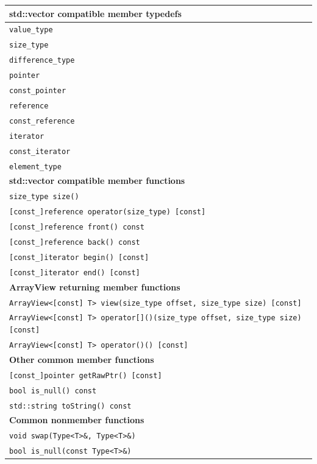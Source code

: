 \documentclass[pdf,ps2pdf,11pt]{SANDreport}
\begin{document}
\begin{table}
{\small\begin{center}
\begin{tabular}{|l|}
\hline
{}\textbf{std::vector compatible member typedefs} \\
\hline
{}\texttt{value\_type} \\
{}\texttt{size\_type} \\
{}\texttt{difference\_type} \\
{}\texttt{pointer} \\
{}\texttt{const\_pointer} \\
{}\texttt{reference} \\
{}\texttt{const\_reference} \\
{}\texttt{iterator} \\
{}\texttt{const\_iterator} \\
{}\texttt{element\_type} \\
\hline
{}\textbf{std::vector compatible member functions} \\
\hline
{}\texttt{size\_type size()} \\
{}\texttt{[const\_]reference operator{}(size\_type) [const]} \\
{}\texttt{[const\_]reference front() const} \\
{}\texttt{[const\_]reference back() const} \\
{}\texttt{[const\_]iterator begin() [const]} \\
{}\texttt{[const\_]iterator end() [const]} \\
\hline
{}\textbf{ArrayView returning member functions} \\
\hline
{}\texttt{ArrayView<[const] T> view(size\_type offset, size\_type size) [const]} \\
{}\texttt{ArrayView<[const] T> operator[]()(size\_type offset, size\_type size) [const]} \\
{}\texttt{ArrayView<[const] T> operator()() [const]} \\
\hline
{}\textbf{Other common member functions} \\
\hline
{}\texttt{[const\_]pointer getRawPtr() [const]} \\
{}\texttt{bool is\_null() const} \\
{}\texttt{std::string toString() const} \\
\hline
{}\textbf{Common nonmember functions} \\
\hline
{}\texttt{void swap(Type<T>\&, Type<T>\&)} \\
{}\texttt{bool is\_null(const Type<T>\&)} \\

\end{tabular}
\end{center}}
\end{table}
\end{document}
